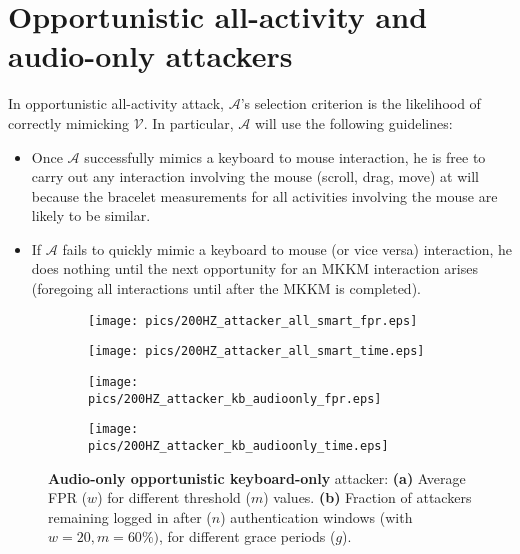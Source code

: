 \documentclass[conference]{IEEEtran}
\newcommand{\KBactivity}{keyboard-only\xspace}
\newcommand{\allactivity}{all-activity\xspace}
\newcommand{\attacker}{$\mathcal{A}$\xspace}
\newcommand{\victim}{$\mathcal{V}$\xspace}
\begin{document}
\vspace{-5mm}
\section{Opportunistic all-activity and audio-only attackers}
\label{app:extra_attackers}
In opportunistic \allactivity attack, \attacker's selection
criterion is the likelihood of correctly mimicking \victim. In
particular, \attacker will use the following guidelines:
\begin{itemize}
\itemsep0em
\item Once \attacker successfully mimics a keyboard to mouse interaction, he
  is free to carry out any interaction involving the mouse (scroll,
  drag, move) at will because the bracelet measurements for all
  activities involving the mouse are likely to be similar.
\item If \attacker fails to quickly mimic a keyboard to mouse (or vice
  versa) interaction, he
  does nothing until the next opportunity for an MKKM
  interaction arises (foregoing all interactions until after the MKKM
  is completed).
\end{itemize}


\begin{figure}[htbp]
\centering
\begin{subfigure}{.5\textwidth}
  \centering
  \texttt{[image: pics/200HZ\_attacker\_all\_smart\_fpr.eps]}
\caption{}
  \label{fig:all_smart_fpr}
\end{subfigure}\begin{subfigure}{.5\textwidth}
  \centering
  \texttt{[image: pics/200HZ\_attacker\_all\_smart\_time.eps]}
\caption{}
  \label{fig:all_smart_time}
\end{subfigure}
\caption{\textbf{Opportunistic \allactivity} attacker: \textbf{(a)}
  Average FPR for different threshold ($m$) values. \textbf{(b)}
  Fraction of attackers remaining logged in after ($n$) authentication
  windows (with $w=20, m=60\%)$, for different grace periods ($g$).}
\centering
\begin{subfigure}{.5\textwidth}
  \centering
  \texttt{[image: pics/200HZ\_attacker\_kb\_audioonly\_fpr.eps]}
\caption{}
  \label{fig:kb_audioonly_fpr}
\end{subfigure}\begin{subfigure}{.5\textwidth}
  \centering
  \texttt{[image: pics/200HZ\_attacker\_kb\_audioonly\_time.eps]}
\caption{}
  \label{fig:kb_audioonly_time}
\end{subfigure}
\caption{\textbf{Audio-only opportunistic \KBactivity} attacker:
  \textbf{(a)} Average FPR ($w$) for different threshold ($m$)
  values. \textbf{(b)} Fraction of attackers remaining logged in after
  ($n$) authentication windows (with $w=20, m=60\%)$, for different grace periods ($g$).}
\end{figure}
\fi
 
\end{document}

